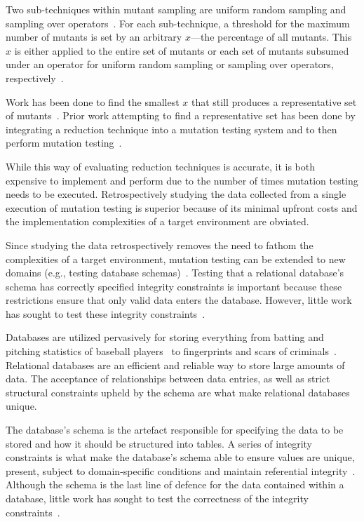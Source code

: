 Two sub-techniques within mutant sampling are uniform random sampling and sampling over
operators~\cite{gopinath2015mutation, gopinath2015empirical}.
For each sub-technique, a threshold for the maximum number of mutants is set by an arbitrary
$x$---the percentage of all mutants.
This $x$ is either applied to the entire set of mutants or each set of mutants subsumed
under an operator for uniform random sampling or sampling over operators,
respectively~\cite{gopinath2015mutation, gopinath2015empirical}.

Work has been done to find the smallest $x$ that still produces
a representative set of mutants~\cite{jia2011analysis, mathur1994empirical}. Prior work
attempting to find a representative set has been done by integrating a reduction technique into
a mutation testing system and to then perform mutation testing~\cite{demillo1988extended, king1991fortran}.

While this way of evaluating reduction techniques is accurate, it is both
expensive to implement and perform due to the number of times mutation testing
needs to be executed. Retrospectively studying the data
collected from a single execution of mutation testing is superior
because of its minimal upfront costs and the implementation complexities of
a target environment are obviated.

Since studying the data retrospectively removes the need to fathom the complexities of a target environment,
mutation testing can be extended to new domains (e.g., testing database schemas)~\cite{mcminn2016virtual, mcminn2015effectiveness, wright2013efficient}.
Testing that a relational database's schema has correctly specified integrity constraints is important
because these restrictions ensure that only valid data enters the database. However, little work has
sought to test these integrity constraints~\cite{mcminn2016virtual}.

Databases are utilized pervasively for storing everything from batting and pitching statistics of baseball
players~\cite{lahmanbaseball} to fingerprints and scars of criminals~\cite{ngi}.
Relational databases are an efficient and reliable way to store large amounts of data.
The acceptance of relationships between data entries, as well as strict structural constraints
upheld by the schema are what make relational databases unique.

The database's schema is the artefact responsible for specifying the data to be stored and
how it should be structured into tables. A series of integrity constraints
is what make the database's schema able to ensure values are unique, present,
subject to domain-specific conditions and maintain referential integrity~\cite{mcminn2016virtual}.
Although the schema is the last line of defence for the data contained
within a database, little work has sought to test the correctness of the integrity constraints~\cite{mcminn2015effectiveness}.

